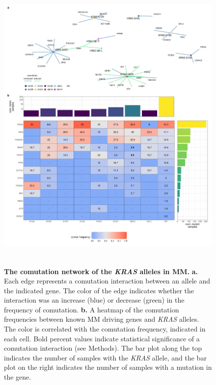 \documentclass[english, 12pt, letterpaper]{article}
\newcommand{\KRAS}{\emph{KRAS}}
\begin{document}
\begin{figure}[p]
\centering
\includegraphics[height=150mm]{figures/SuppFigure_09.jpeg}
\caption{
    \textbf{The comutation network of the \KRAS{} alleles in MM.} 
    \textbf{a.} Each edge represents a comutation interaction between an allele and the indicated gene. The color of the edge indicates whether the interaction was an increase (blue) or decrease (green) in the frequency of comutation.
    \textbf{b.} A heatmap of the comutation frequencies between known MM driving genes and \KRAS{} alleles. The color is correlated with the comutation frequency, indicated in each cell. Bold percent values indicate statistical significance of a comutation interaction (see Methods). The bar plot along the top indicates the number of samples with the \KRAS{} allele, and the bar plot on the right indicates the number of samples with a mutation in the gene.
}
\label{sfig:mm_labeled-comutation}
\end{figure}
\end{document}
